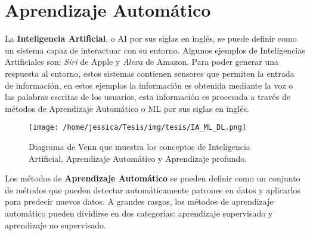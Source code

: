 \chapter{Aprendizaje Automático}\label{ch:ML}




La \textbf{Inteligencia Artificial}, o AI por sus siglas en inglés, se puede definir como un sistema capaz de interactuar con su entorno. Algunos ejemplos de Inteligencias Artificiales son: \emph{Siri} de Apple y \emph{Alexa} de Amazon. Para poder generar una respuesta al entorno, estos sistemas contienen sensores que permiten la entrada de información, en estos ejemplos la información es obtenida mediante la voz o las palabras escritas de los usuarios, esta información es procesada a través de métodos de Aprendizaje Automático o ML por sus siglas en inglés.

\begin{figure}[!htbp]
  \centering
  \texttt{[image: /home/jessica/Tesis/img/tesis/IA\_ML\_DL.png]}
  \caption{Diagrama de Venn que muestra los conceptos de Inteligencia Artificial, Aprendizaje Automático y Aprendizaje profundo.}
  \label{fig:IA-ML-DL}
\end{figure}

Los métodos de \textbf{Aprendizaje Automático} se pueden definir como un conjunto de métodos que pueden detectar automáticamente patrones en datos y aplicarlos para predecir nuevos datos. A grandes rasgos, los métodos de aprendizaje automático pueden dividirse en dos categorías: aprendizaje supervisado y aprendizaje no supervisado. \cite{murphy:2013}

